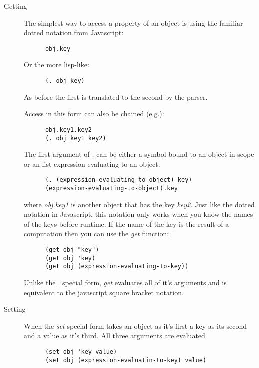 \documentclass[11pt]{article}
\begin{document}
\begin{description}

\item[Getting]\label{sec-1.3.2.1}


     The simplest way to access a property of an object is using the
     familiar dotted notation from Javascript:
     
\begin{verbatim}
      obj.key
\end{verbatim}

     
     Or the more lisp-like:
     
\begin{verbatim}
      (. obj key)
\end{verbatim}

     
     As before the first is translated to the second by the parser.
     
     Access in this form can also be chained (e.g.):
     
\begin{verbatim}
      obj.key1.key2
      (. obj key1 key2)
\end{verbatim}

     
     The first argument of \emph{.} can be either a symbol bound to an
     object in scope or an list expression evaluating to an object:
     
\begin{verbatim}
      (. (expression-evaluating-to-object) key)
      (expression-evaluating-to-object).key
\end{verbatim}

     
     where \emph{obj.key1} is another object that has the key \emph{key2}. Just
     like the dotted notation in Javascript, this notation only works
     when you know the names of the keys before runtime.  If the name
     of the key is the result of a computation then you can use the
     \emph{get} function:
     
\begin{verbatim}
      (get obj "key")
      (get obj 'key)
      (get obj (expression-evaluating-to-key))
\end{verbatim}

     
     Unlike the \emph{.} special form, \emph{get} evaluates all of it's
     arguments and is equivalent to the javascript square bracket
     notation.
     
\end{description}
\begin{description}

\item[Setting]\label{sec-1.3.2.2}


     When the \emph{set} special form takes an object as it's first a key
     as its second and a value as it's third.  All three arguments are
     evaluated.
     
\begin{verbatim}
      (set obj 'key value)
      (set obj (expression-evaluatin-to-key) value)
\end{verbatim}

     
\end{description}
\end{document}
